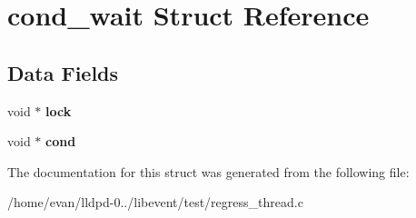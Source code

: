 \section{cond\-\_\-wait \-Struct \-Reference}
\label{structcond__wait}
\subsection*{\-Data \-Fields}
\begin{DoxyCompactItemize}
\item 
void $\ast$ {\bfseries lock}\label{structcond__wait_a100fdaedb8eb0d56fd262e7ea2930930}

\item 
void $\ast$ {\bfseries cond}\label{structcond__wait_af7f4074a8d6edcd8d3adb49221a28ff4}

\end{DoxyCompactItemize}


\-The documentation for this struct was generated from the following file\-:\begin{DoxyCompactItemize}
\item 
/home/evan/lldpd-\/0../libevent/test/regress\-\_\-thread.\-c\end{DoxyCompactItemize}
